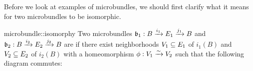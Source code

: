 \begin{myparagraph}
    Before we look at examples of microbundles, we should first clarify
    what it means for two microbundles to be isomorphic.
\end{myparagraph}

\begin{mydefinition}[isomorphy]{microbundle::isomorphy}
    Two microbundles $\bundledef{\bb_1}{B}{E_1}{i_1}{j_1}$ and $\bundledef{\bb_2}{B}{E_2}{i_2}{j_2}$ are  if
    there exist neighborhoods $V_1 \sub E_1$ of $i_1(B)$ and $V_2 \sub E_2$ of $i_2(B)$ with
    a homeomorphism $\phi: V_1 \isomto V_2$ such that the following diagram commutes: 
    \begin{center}
    \end{center}
\end{mydefinition}